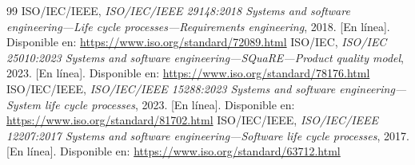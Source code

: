 \begin{thebibliography}{99}
 ISO/IEC/IEEE, \emph{ISO/IEC/IEEE 29148:2018 Systems and software engineering---Life cycle processes---Requirements engineering}, 2018. [En línea]. Disponible en: \url{https://www.iso.org/standard/72089.html}
 ISO/IEC, \emph{ISO/IEC 25010:2023 Systems and software engineering---SQuaRE---Product quality model}, 2023. [En línea]. Disponible en: \url{https://www.iso.org/standard/78176.html}
 ISO/IEC/IEEE, \emph{ISO/IEC/IEEE 15288:2023 Systems and software engineering---System life cycle processes}, 2023. [En línea]. Disponible en: \url{https://www.iso.org/standard/81702.html}
 ISO/IEC/IEEE, \emph{ISO/IEC/IEEE 12207:2017 Systems and software engineering---Software life cycle processes}, 2017. [En línea]. Disponible en: \url{https://www.iso.org/standard/63712.html}


\end{thebibliography}
